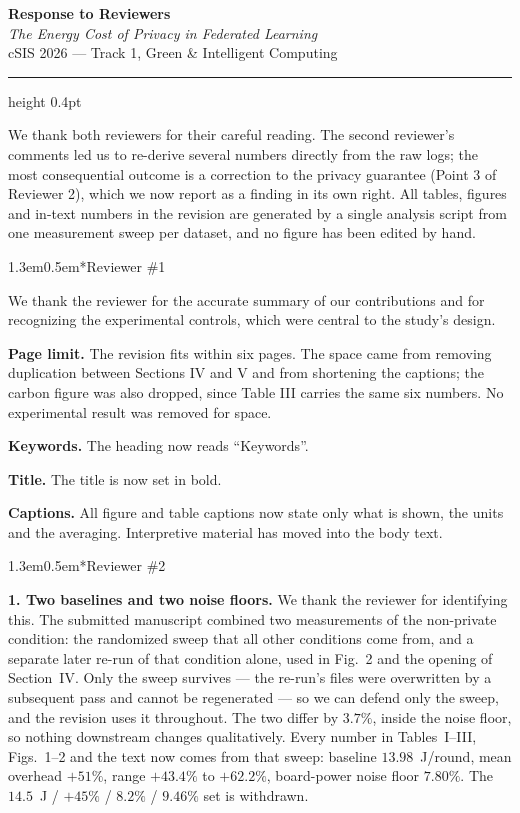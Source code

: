 \documentclass[10pt,a4paper]{article}
\makeatletter
\renewcommand{\section}{\@startsection{section}{1}{0pt}%
  {1.3em}{0.5em}{\large\bfseries}}
\makeatother
\begin{document}
\begin{center}
{\large\bfseries Response to Reviewers}\\[0.3em]
{\itshape The Energy Cost of Privacy in Federated Learning}\\[0.15em]
cSIS 2026 --- Track 1, Green \& Intelligent Computing
\end{center}

\hrule height 0.4pt
\medskip

We thank both reviewers for their careful reading. The second reviewer's
comments led us to re-derive several numbers directly from the raw logs; the
most consequential outcome is a correction to the privacy guarantee (Point 3 of
Reviewer 2), which we now report as a finding in its own right. All tables,
figures and in-text numbers in the revision are generated by a single analysis
script from one measurement sweep per dataset, and no figure has been edited by
hand.

\section*{Reviewer \#1}

We thank the reviewer for the accurate summary of our contributions and for
recognizing the experimental controls, which were central to the study's
design.

\textbf{Page limit.} The revision fits within six pages. The space came from
removing duplication between Sections IV and V and from shortening the
captions; the carbon figure was also dropped, since Table III carries the same
six numbers. No experimental result was removed for space.

\textbf{Keywords.} The heading now reads ``Keywords''.

\textbf{Title.} The title is now set in bold.

\textbf{Captions.} All figure and table captions now state only what is shown,
the units and the averaging. Interpretive material has moved into the body
text.

\section*{Reviewer \#2}

\textbf{1. Two baselines and two noise floors.} We thank the reviewer for
identifying this. The submitted manuscript combined two measurements of the
non-private condition: the randomized sweep that all other conditions come
from, and a separate later re-run of that condition alone, used in Fig.~2 and
the opening of Section~IV. Only the sweep survives --- the re-run's files were
overwritten by a subsequent pass and cannot be regenerated --- so we can defend
only the sweep, and the revision uses it throughout. The two differ by
$3.7\%$, inside the noise floor, so nothing downstream changes qualitatively.
Every number in Tables~I--III, Figs.~1--2 and the text now comes from that
sweep: baseline $13.98$~J/round, mean overhead $+51\%$, range $+43.4\%$ to
$+62.2\%$, board-power noise floor $7.80\%$. The $14.5$~J / $+45\%$ / $8.2\%$ /
$9.46\%$ set is withdrawn.
\end{document}
